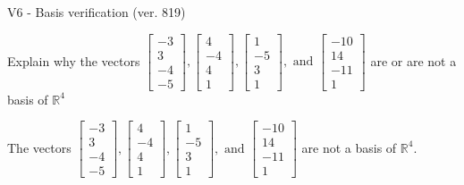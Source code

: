 \begin{exercise}
  \begin{exerciseTitle}V6 - Basis verification (ver. 819)\end{exerciseTitle}
  \begin{exerciseStatement}
    Explain why the vectors \(\left[\begin{array}{r}
-3 \\
3 \\
-4 \\
-5
\end{array}\right] , \left[\begin{array}{r}
4 \\
-4 \\
4 \\
1
\end{array}\right] , \left[\begin{array}{r}
1 \\
-5 \\
3 \\
1
\end{array}\right] , \text{ and } \left[\begin{array}{r}
-10 \\
14 \\
-11 \\
1
\end{array}\right]\) are or are not a basis of \(\mathbb{R}^4\)	


  \end{exerciseStatement}
  \begin{exerciseAnswer}
   The vectors \(\left[\begin{array}{r}
-3 \\
3 \\
-4 \\
-5
\end{array}\right] , \left[\begin{array}{r}
4 \\
-4 \\
4 \\
1
\end{array}\right] , \left[\begin{array}{r}
1 \\
-5 \\
3 \\
1
\end{array}\right] , \text{ and } \left[\begin{array}{r}
-10 \\
14 \\
-11 \\
1
\end{array}\right]\) 
  	 are not  a basis of \(\mathbb{R}^4\).
  


  \end{exerciseAnswer}
\end{exercise}